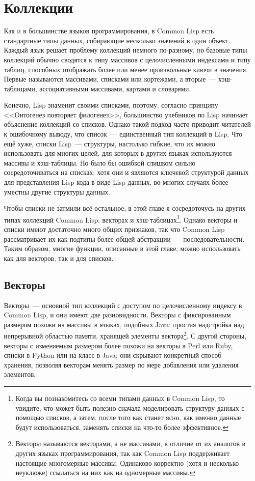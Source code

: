 \chapter{Коллекции}
\label{ch:11}

Как и в большинстве языков программирования, в Common Lisp есть стандартные типы данных,
собирающие несколько значений в один объект.  Каждый язык решает проблему коллекций
немного по-разному, но базовые типы коллекций обычно сводятся к типу массивов с целочисленными
индексами и типу таблиц, способных отображать более или менее
произвольные ключи в значения.  Первые называются массивами, списками или кортежами, а
вторые~--- хэш-таблицами, ассоциативными массивами, картами и словарями.

Конечно, Lisp знаменит своими списками, поэтому, согласно принципу <<Онтогенез повторяет
филогенез>>, большинство учебников по Lisp начинает объяснение коллекций со
списков. Однако такой подход часто приводит читателей к ошибочному выводу, что
список~--- единственный тип коллекций в Lisp.  Что ещё хуже,
списки Lisp~--- структуры, настолько гибкие, что их можно использовать для многих целей, для
которых в других языках используются массивы и хэш-таблицы.  Но было бы ошибкой слишком
сильно сосредоточиваться на списках; хотя они и являются ключевой структурой данных для
представления Lisp-кода в виде Lisp-данных, во многих случаях более уместны другие структуры данных.

Чтобы списки не затмили всё остальное, в этой главе я сосредоточусь на других типах
коллекций Common Lisp: векторах и хэш-таблицах\footnote{Когда вы познакомитесь со всеми
  типами данных в Common Lisp, то увидите, что может быть полезно сначала моделировать
  структуру данных с помощью списков, а затем, после того как станет ясно, как именно данные
  будут использоваться, заменять списки на что-то более эффективное.}.
Однако векторы и списки имеют достаточно много общих признаков, так что Common Lisp
рассматривает их как подтипы более общей абстракции~--- последовательности.  Таким образом,
многие функции, описанные в этой главе, можно использовать как для векторов, так и для
списков.

\section{Векторы}

Векторы~--- основной тип коллекций с доступом по целочисленному индексу в Common Lisp, и они
имеют две разновидности.  Векторы с фиксированным размером похожи на массивы в языках,
подобных Java: простая надстройка над непрерывной областью памяти, хранящей элементы
вектора\footnote{Векторы называются векторами, а не массивами, в отличие от их аналогов в других
  языках программирования, так как Common Lisp поддерживает настоящие многомерные
  массивы.  Одинаково корректно (хотя и несколько неуклюже) ссылаться на них как на
  одномерные массивы.}. С другой стороны, векторы с изменяемым размером более похожи на
векторы в Perl или Ruby, списки в Python или на класс  в Java: они скрывают
конкретный способ хранения, позволяя векторам менять размер по мере добавления или
удаления элементов.

